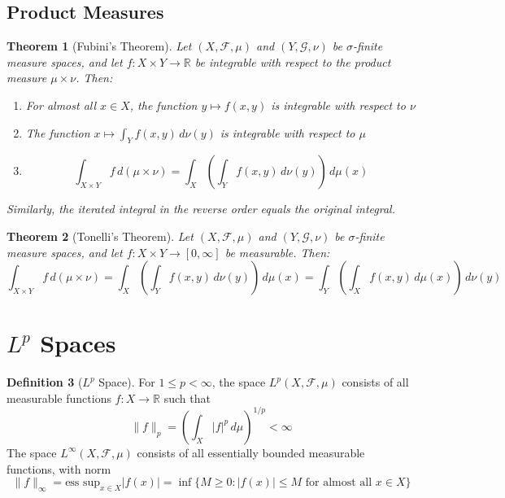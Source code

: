 \documentclass[12pt,a4paper]{article}
\theoremstyle{plain}
\newtheorem{theorem}{Theorem}[section]
\theoremstyle{definition}
\newtheorem{definition}[theorem]{Definition}
\begin{document}
\subsection{Product Measures}

\begin{theorem}[Fubini's Theorem]
Let $(X, \mathcal{F}, \mu)$ and $(Y, \mathcal{G}, \nu)$ be $\sigma$-finite measure spaces, and let $f: X \times Y \to \mathbb{R}$ be integrable with respect to the product measure $\mu \times \nu$. Then:
\begin{enumerate}[label=(\roman*)]
\item For almost all $x \in X$, the function $y \mapsto f(x,y)$ is integrable with respect to $\nu$
\item The function $x \mapsto \int_Y f(x,y) \, d\nu(y)$ is integrable with respect to $\mu$
\item 
\begin{equation}
\int_{X \times Y} f \, d(\mu \times \nu) = \int_X \left( \int_Y f(x,y) \, d\nu(y) \right) \, d\mu(x)
\end{equation}
\end{enumerate}
Similarly, the iterated integral in the reverse order equals the original integral.
\end{theorem}

\begin{theorem}[Tonelli's Theorem]
Let $(X, \mathcal{F}, \mu)$ and $(Y, \mathcal{G}, \nu)$ be $\sigma$-finite measure spaces, and let $f: X \times Y \to [0, \infty]$ be measurable. Then:
\begin{equation}
\int_{X \times Y} f \, d(\mu \times \nu) = \int_X \left( \int_Y f(x,y) \, d\nu(y) \right) \, d\mu(x) = \int_Y \left( \int_X f(x,y) \, d\mu(x) \right) \, d\nu(y)
\end{equation}
\end{theorem}

\section{$L^p$ Spaces}

\begin{definition}[$L^p$ Space]
For $1 \leq p < \infty$, the space $L^p(X, \mathcal{F}, \mu)$ consists of all measurable functions $f: X \to \mathbb{R}$ such that
\begin{equation}
\|f\|_p = \left( \int_X |f|^p \, d\mu \right)^{1/p} < \infty
\end{equation}
The space $L^\infty(X, \mathcal{F}, \mu)$ consists of all essentially bounded measurable functions, with norm
\begin{equation}
\|f\|_\infty = \text{ess sup}_{x \in X} |f(x)| = \inf \{M \geq 0 : |f(x)| \leq M \text{ for almost all } x \in X\}
\end{equation}
\end{definition}
\end{document}
